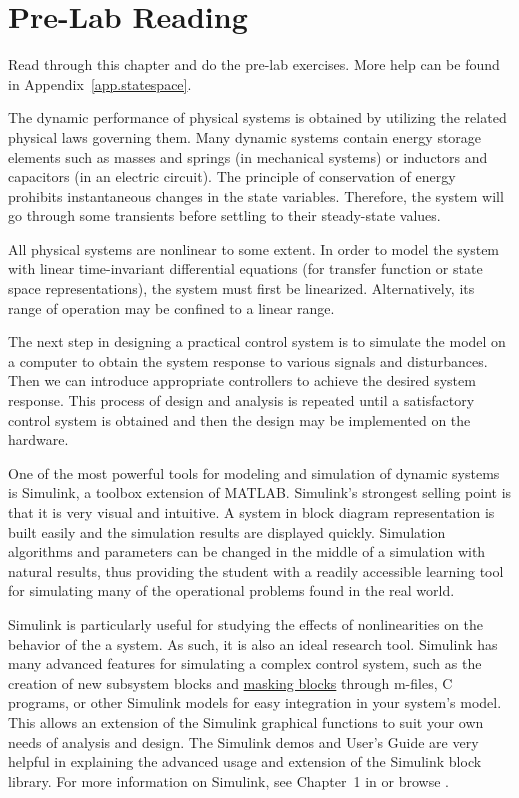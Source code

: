 \section{Pre-Lab Reading}
Read through this chapter and do the pre-lab exercises.  More help can be found in Appendix~\ref{app.statespace}.
\par
The dynamic performance of physical systems is obtained by utilizing the related physical laws governing them.  Many dynamic systems contain energy storage elements such as masses and springs (in mechanical systems) or inductors and capacitors (in an electric circuit).  The principle of conservation of energy prohibits instantaneous changes in the state variables. Therefore, the system will go through some transients before settling to their steady-state values.
\par
All physical systems are nonlinear to some extent.  In order to model the system with linear time-invariant differential equations (for transfer function or state space representations), the system must first be linearized.  Alternatively, its range of operation may be confined to a linear range.
\par
The next step in designing a practical control system is to simulate the model on a computer to obtain the system response to various signals and disturbances.  Then we can introduce appropriate controllers to achieve the desired system response.  This process of design and analysis is repeated until a satisfactory control system is obtained and then the design may be implemented on the hardware.
\par
One of the most powerful tools for modeling and simulation of dynamic systems is Simulink, a toolbox extension of MATLAB.  Simulink's strongest selling point is that it is very visual and intuitive.  A system in block diagram representation is built easily and the simulation results are displayed quickly.  Simulation algorithms and parameters can be changed in the middle of a simulation with natural results, thus providing the student with a readily accessible learning tool for simulating many of the operational problems found in the real world.
\par
Simulink is particularly useful for studying the effects of nonlinearities on the behavior of the a system.  As such, it is also an ideal research tool.  Simulink has many advanced features for simulating a complex control system, such as the creation of new subsystem blocks and \uline{masking blocks} through m-files, C programs, or other Simulink models for easy integration in your system's model.  This allows an extension of the Simulink graphical functions to suit your own needs of analysis and design.  The Simulink demos and User's Guide are very helpful in explaining the advanced usage and extension of the Simulink block library.  For more information on Simulink, see Chapter~1 in \cite{saadatbook} or browse \cite{saadatsite}.

